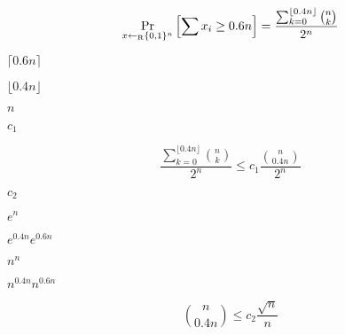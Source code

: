 \documentclass[10pt]{book}
\begin{document}
\begin{mdSnippets}
\begin{mdDisplaySnippet}[3ff989622f37a31ee130f8150a68a513]
\[%
\Pr_{x \getsr \zo^n}\left[\sum x_i \geq 0.6n \right] = \frac{\sum_{k=0}^{\lfloor 0.4n \rfloor} {n \choose k}}{2^n}
\]%
\end{mdDisplaySnippet}%
\begin{mdInlineSnippet}[9fb8d9e4a7924561de52173ccdd165a0]%
$\lceil 0.6n \rceil$\end{mdInlineSnippet}%
\begin{mdInlineSnippet}[07a1d70dccf104fe1a68d46b7760ec3f]%
$\lfloor 0.4n \rfloor$\end{mdInlineSnippet}%
\begin{mdInlineSnippet}[7b8b965ad4bca0e41ab51de7b31363a1]%
$n$\end{mdInlineSnippet}%
\begin{mdInlineSnippet}%
$c_1$\end{mdInlineSnippet}%
\begin{mdDisplaySnippet}[f325d0b78fd7a62996d8d1de947e18f1]%
\[%
\frac{\sum_{k=0}^{\lfloor 0.4n \rfloor} {n \choose k}}{2^n} \leq c_1\frac{ {n \choose 0.4n }}{2^n}
\]%
\end{mdDisplaySnippet}%
\begin{mdInlineSnippet}[71f0427a673c14326195285a092cc63a]%
$c_2$\end{mdInlineSnippet}%
\begin{mdInlineSnippet}[83d06d7c4b3528b76096ddf391db9b35]%
$e^n$\end{mdInlineSnippet}%
\begin{mdInlineSnippet}[4493f41c97fe005a21de2f7efbddb6e3]%
$e^{0.4n}e^{0.6n}$\end{mdInlineSnippet}%
\begin{mdInlineSnippet}[9469957aeb9f8942af9ca265a531df03]%
$n^n$\end{mdInlineSnippet}%
\begin{mdInlineSnippet}%
$n^{0.4n}n^{0.6n}$\end{mdInlineSnippet}%
\begin{mdDisplaySnippet}%
\[%
{n \choose 0.4n} \leq c_2\frac{\sqrt{n}}{n}
\]%
\end{mdDisplaySnippet}%

\end{mdSnippets}
\end{document}
